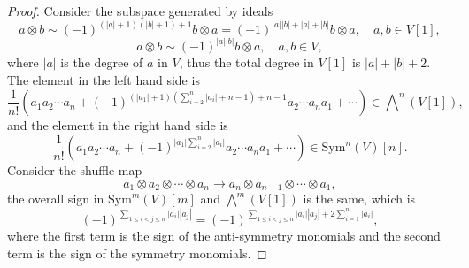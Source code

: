 \documentclass[10pt]{article}
\begin{document}
\begin{proof}
  Consider the subspace generated by ideals
  \begin{equation*}
    a \otimes b \sim (-1)^{(|a|+1)(|b| + 1) + 1} b \otimes a = (-1)^{|a||b| + |a| + |b|} b \otimes a, \quad a,b \in V[1],
  \end{equation*}
  \begin{equation*}
    a \otimes b \sim (-1)^{|a||b|} b \otimes a, \quad a,b \in V,
  \end{equation*}
  where $\left| a \right|$ is the degree of $ a$ in $ V$, thus the total degree in $ V[1]$ is $\left| a \right| + \left| b \right| + 2$.
  The element in the left hand side is
  \begin{equation*}
    \frac{1}{n!} \left( a_1a_2 \cdots a_n + (-1)^{(\left| a_1 \right|+1) \left( \sum_{i=2}^{n} \left| a_i \right| + n-1\right) + n - 1} a_2 \cdots a_n a_1  + \cdots \right) \in \bigwedge\nolimits^{n} \left( V[1] \right),
  \end{equation*}
  and the element in the right hand side is
  \begin{equation*}
    \frac{1}{n!} \left( a_1a_2 \cdots a_n + (-1)^{\left| a_1 \right| \sum_{i=2}^{n} \left| a_i \right| } a_2 \cdots a_n a_1  + \cdots \right) \in \mathrm{Sym}^{n} (V)[n].
  \end{equation*}
  Consider the shuffle map
  \begin{equation*}
    a_1 \otimes a_2 \otimes \cdots \otimes a_n \rightarrow a_n \otimes a_{n-1} \otimes \cdots \otimes a_{1},
  \end{equation*}
  the overall sign in $ \mathrm{Sym}^{m}(V)[m]$ and $\bigwedge^{m}(V[1])$ is the same, which is
  \begin{equation*}
    (-1)^{\sum_{1 \le i < j \le n} \left| a_i \right| \left| a_j \right|} = (-1)^{\sum_{1 \le i < j \le n} \left| a_i \right|\left| a_j \right| + 2 \sum_{i=1}^{n} \left| a_i \right|},
  \end{equation*}
  where the first term is the sign of the anti-symmetry monomials and the second term is the sign of the symmetry monomials.

\end{proof}
\end{document}

